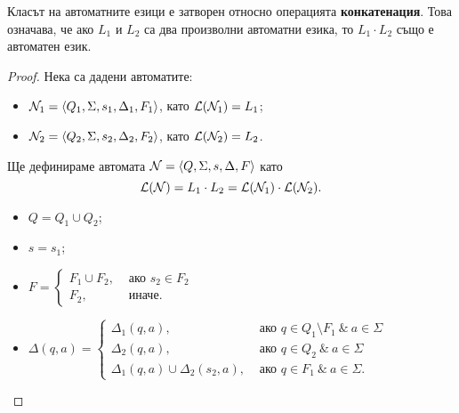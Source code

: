 \begin{lemma}
  Класът на автоматните езици е затворен относно операцията {\bf конкатенация}.
  Това означава, че ако $L_1$ и $L_2$ са два произволни автоматни езика, то $L_1\cdot L_2$
  също е автоматен език.
\end{lemma}
\begin{proof}
  Нека са дадени автоматите:
  \begin{itemize}
  \item
    $\mathcal{N}_1 = \langle{Q_1,\Sigma,s_1,\Delta_1,F_1}\rangle$, като $\mathcal{L}(\mathcal{N}_1) = L_1$;
  \item
    $\mathcal{N}_2 = \langle{Q_2,\Sigma,s_2,\Delta_2,F_2}\rangle$, като $\mathcal{L}(\mathcal{N}_2) = L_2$.
  \end{itemize}
  Ще дефинираме автомата $\mathcal{N} = \langle{Q,\Sigma,s,\Delta,F}\rangle$ като
  \[\mathcal{L}(\mathcal{N}) = L_1\cdot L_2 = \mathcal{L}(\mathcal{N}_1)\cdot\mathcal{L}(\mathcal{N}_2).\]
  \begin{itemize}
  \item
    $Q = Q_1 \cup Q_2$;
  \item
    $s = s_1$;
  \item
    $F = 
    \begin{cases}
      F_1 \cup F_2, & \text{ ако } s_2 \in F_2\\
      F_2,          & \text{ иначе}.
    \end{cases}$
  \item 
    $\Delta(q,a) = 
    \begin{cases}
      \Delta_1(q,a),                      & \text{ ако }q\in Q_1\setminus F_1\ \&\ a\in\Sigma\\
      \Delta_2(q,a),                      & \text{ ако }q\in Q_2\ \&\ a\in\Sigma\\
      \Delta_1(q,a) \cup \Delta_2(s_2,a), & \text{ ако }q \in F_1\ \&\ a\in\Sigma.
    \end{cases}$
  \end{itemize}
\end{proof}

